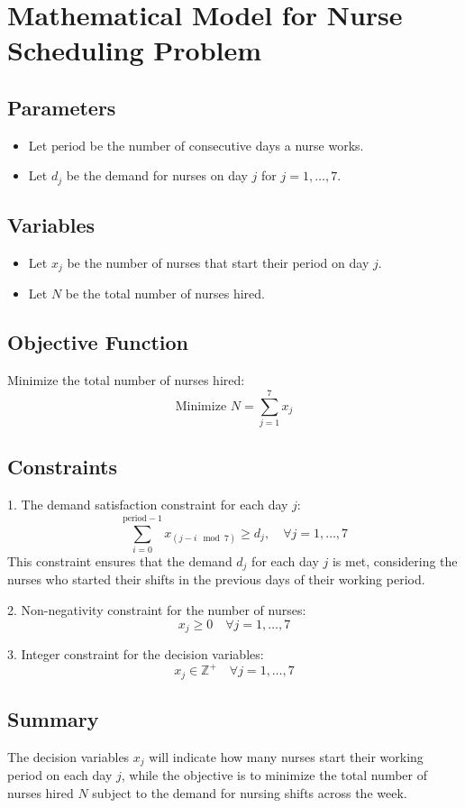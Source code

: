 \documentclass{article}
\begin{document}
\section*{Mathematical Model for Nurse Scheduling Problem}

\subsection*{Parameters}
\begin{itemize}
    \item Let \( \text{period} \) be the number of consecutive days a nurse works.
    \item Let \( d_j \) be the demand for nurses on day \( j \) for \( j = 1, \ldots, 7 \).
\end{itemize}

\subsection*{Variables}
\begin{itemize}
    \item Let \( x_j \) be the number of nurses that start their period on day \( j \).
    \item Let \( N \) be the total number of nurses hired.
\end{itemize}

\subsection*{Objective Function}
Minimize the total number of nurses hired:
\[
\text{Minimize } N = \sum_{j=1}^{7} x_j
\]

\subsection*{Constraints}
1. The demand satisfaction constraint for each day \( j \):
\[
\sum_{i=0}^{\text{period}-1} x_{(j-i \mod 7)} \geq d_j, \quad \forall j = 1, \ldots, 7
\]
   This constraint ensures that the demand \( d_j \) for each day \( j \) is met, considering the nurses who started their shifts in the previous days of their working period.

2. Non-negativity constraint for the number of nurses:
\[
x_j \geq 0 \quad \forall j = 1, \ldots, 7
\]

3. Integer constraint for the decision variables:
\[
x_j \in \mathbb{Z}^+ \quad \forall j = 1, \ldots, 7
\]

\subsection*{Summary}
The decision variables \( x_j \) will indicate how many nurses start their working period on each day \( j \), while the objective is to minimize the total number of nurses hired \( N \) subject to the demand for nursing shifts across the week.
\end{document}
